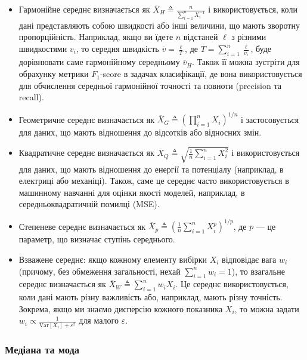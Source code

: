 \documentclass{exam_template}
\begin{document}
\begin{itemize}
    \item \textcolor{blue!70!black}{Гармонійне середнє} визначається як
    $\overline{X}_H \triangleq \frac{n}{\sum_{i=1}^n X_i^{-1}}$ і
    використовується, коли дані представляють собою швидкості або інші величини,
    що мають зворотну пропорційність. Наприклад, якщо ви їдете $n$ відстаней
    $\ell$ з різними швидкостями $v_i$, то середня швидкість $\overline{v} =
    \frac{\ell}{T}$, де $T = \sum_{i=1}^n \frac{\ell}{v_i}$, буде дорівнювати
    саме гармонійному середньому $\overline{v}_H$. Також її можна зустріти для 
    обрахунку метрики $F_1$-score в задачах класифікації, де вона використовується
    для обчислення середньої гармонійної точності та повноти (precision та
    recall).
    \item \textcolor{blue!70!black}{Геометричне середнє} визначається як
    $\overline{X}_G \triangleq \left(\prod_{i=1}^n X_i\right)^{1/n}$ і
    застосовується для даних, що мають відношення до відсотків або відносних
    змін.
    \item \textcolor{blue!70!black}{Квадратичне середнє} визначається як
    $\overline{X}_Q \triangleq \sqrt{\frac{1}{n} \sum_{i=1}^n X_i^2}$ і
    використовується для даних, що мають відношення до енергії та потенціалу
    (наприклад, в електриці або механіці). Також, саме це середнє часто
    використовується в машинному навчанні для оцінки якості моделей, наприклад,
    в середньоквадратичній помилці (MSE).
    \item \textcolor{blue!70!black}{Степеневе середнє} визначається як
    $\overline{X}_p \triangleq \left(\frac{1}{n} \sum_{i=1}^n X_i^p
    \right)^{1/p}$, де $p$ — це параметр, що визначає ступінь середнього.
    \item \textcolor{blue!70!black}{Взважене середнє}: якщо кожному елементу
    вибірки $X_i$ відповідає вага $w_i$ (причому, без обмеження загальності,
    нехай $\sum_{i=1}^n w_i = 1$), то взагальне середнє визначається як
    $\overline{X}_W \triangleq \sum_{i=1}^n w_i X_i$. Це середнє
    використовується, коли дані мають різну важливість або, наприклад, мають
    різну точність. Зокрема, якщо ми знаємо дисперсію кожного показника $X_i$,
    то можна задати $w_i \propto \frac{1}{\text{Var}[X_i]+\varepsilon^2}$ для
    малого $\varepsilon$.
\end{itemize}

\subsubsection{Медіана та мода}\label{sec:median_mode}
\end{document}
